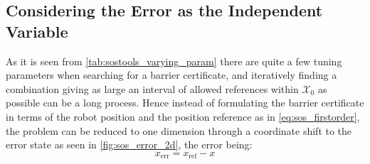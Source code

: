 %
%
%

\newpage
\subsection{Considering the Error as the Independent Variable}\label{sec:sos_1storder_error}

As it is seen from \autoref{tab:sostools_varying_param} there are quite a few tuning parameters when searching for a barrier certificate, and iteratively finding a combination giving as large an interval of allowed references within $\mathcal{X}_0$ as possible can be a long process. %
Hence instead of formulating the barrier certificate in terms of the robot position and the position reference as in \autoref{eq:sos_firstorder}, the problem can be reduced to one dimension  through a coordinate shift to the error state as seen in \autoref{fig:sos_error_2d}, the error being: %
\vspace{-3mm}
\begin{equation*}
x_\text{err}=x_\text{ref}-x
\end{equation*}

